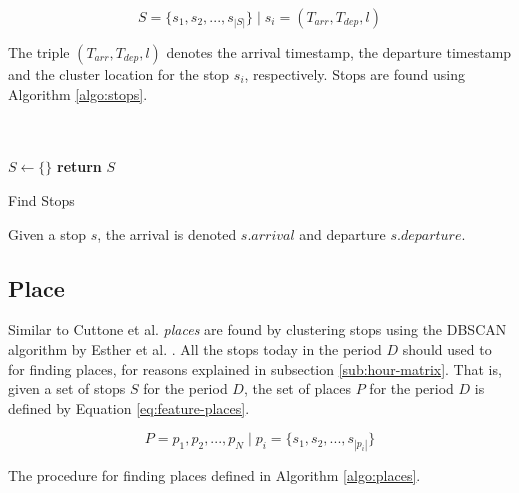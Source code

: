 \begin{equation}
\label{eq:feature-stops}
S = \{s_1, s_2, ..., s_{|S|}\} \;| \; s_i = (T_{arr}, T_{dep}, l)
\end{equation}

The triple $(T_{arr}, T_{dep}, l)$ denotes the arrival timestamp, the departure timestamp and the cluster location for the stop $s_i$, respectively. Stops are found using Algorithm \ref{algo:stops}.

\begin{algorithm}[H]
\SetAlgoLined
{}\\
\\

 $S \leftarrow \{ \}$\;
 \textbf{return} $S$\;
 \label{algo:stops}
 \caption{Find Stops}
\end{algorithm}

Given a stop $s$, the arrival is denoted $s.arrival$ and departure $s.departure$.

\subsection{Place}
Similar to Cuttone et al. \textit{places} are found by clustering stops using the DBSCAN algorithm by Esther et al. \cite{density-based-1996}. All the stops today in the period $D$ should used to for finding places, for reasons explained in subsection \ref{sub:hour-matrix}. That is, given a set of stops $S$ for the period $D$, the set of places $P$ for the period $D$ is defined by Equation \eqref{eq:feature-places}.

\begin{equation}
\label{eq:feature-places}
P = {p_1, p_2, ..., p_N} \;|\; p_i = \{s_1, s_2, ..., s_{|p_i|}\}
\end{equation}

The procedure for finding places defined in Algorithm \ref{algo:places}.

